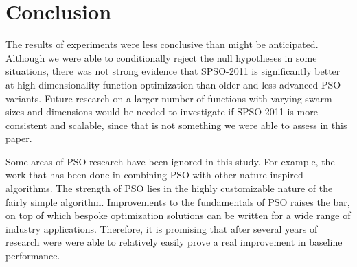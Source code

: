 \documentclass{csfourzero}
\begin{document}
\section{Conclusion}

The results of experiments were less conclusive than might be anticipated.
Although we were able to conditionally reject the null hypotheses in some
situations, there was not strong evidence that SPSO-2011 is significantly better
at high-dimensionality function optimization than older and less advanced PSO
variants. Future research on a larger number of functions with varying swarm
sizes and dimensions would be needed to investigate if SPSO-2011 is more
consistent and scalable, since that is not something we were able to assess in
this paper.

Some areas of PSO research have been ignored in this study. For example, the
work that has been done in combining PSO with other nature-inspired algorithms.
The strength of PSO lies in the highly customizable nature of the fairly simple
algorithm.  Improvements to the fundamentals of PSO raises the bar, on top of
which bespoke optimization solutions can be written for a wide range of industry
applications. Therefore, it is promising that after several years of research
were were able to relatively easily prove a real improvement in baseline
performance.


\end{document}
